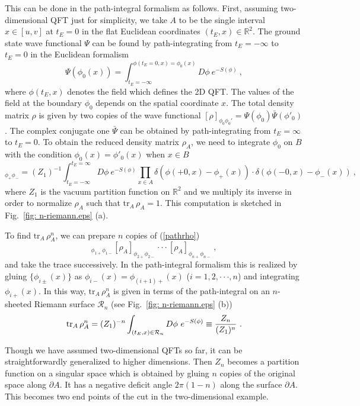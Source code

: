 \documentclass[12pt]{article}
\def\frac#1#2{{#1\over #2}}
\def\de{\partial}
\def\f {\frac}
\def\ddd{\cdot\cdot\cdot}
\def\frac#1#2{{#1\over #2}}
\def\be{\begin{equation}}
\def\ee{\end{equation}}
\begin{document}
This can be done in the path-integral formalism as follows.
First, assuming two-dimensional QFT just for simplicity,
we take
$A$ to be the single interval $x\in [u,v]$ at $t_E=0$ in
the flat Euclidean coordinates $(t_E,x)\in \mathbb{R}^{2}$. The
ground state wave functional $\Psi$ can be found by path-integrating
from $t_{E}=-\infty$ to $t_{E}=0$ in the Euclidean formalism \be
\Psi\left(\phi_0(x)\right)=
\int^{\phi(t_{E}=0,x)=\phi_0(x)}_{t_{E}=-\infty} D\phi~
e^{-S(\phi)} \ ,\ee where $\phi(t_E,x)$ denotes the field which defines
the 2D QFT.
The values of the field at the boundary $\phi_0$ depends
on the spatial coordinate $x$. The total density matrix $\rho$ is
given by two copies of the wave functional
$[\rho]_{\phi_0\phi_0'}=\Psi(\phi_0)\bar{\Psi}(\phi'_0)$. The
complex conjugate one $\bar{\Psi}$ can be obtained by
path-integrating from $t_{E}=\infty$ to $t_{E}=0$. To obtain the
reduced density matrix $\rho_A$, we need to integrate $\phi_0$ on
$B$ with the condition $\phi_{0}(x)=\phi'_0(x)$ when $x\in B$
\be
[\rho_A]_{\phi_+ \phi_-}=(Z_{1})^{-1}\int
^{t_E=\infty}_{t_{E}=-\infty} D\phi~ e^{-S(\phi)}\prod_{x\in
A}\delta\left(\phi(+0,x)-\phi_+(x)\right)\cdot
\delta\left(\phi(-0,x)-\phi_-(x)\right) \ , \label{pathrho}\ee where
$Z_1$ is the vacuum partition function on $\mathbb{R}^{2}$ and we
multiply its inverse in order to normalize $\rho_A$ such that
$\mathrm{tr}_A\,\rho_A=1$. This computation is sketched in Fig.\
\ref{fig: n-riemann.eps} (a).


To find $\mathrm{tr}_A\,\rho_A^n$, we can prepare $n$ copies of
(\ref{pathrho}) \be [\rho_A]_{\phi_{1+}
\phi_{1-}}[\rho_A]_{\phi_{2+} \phi_{2-}}\ddd [\rho_A]_{\phi_{n+}
\phi_{n-}} \ ,\ee and take the trace successively. In the path-integral
formalism this is realized by gluing $\{\phi_{i\pm}(x)\}$ as
$\phi_{i-}(x)=\phi_{(i+1)+}(x)$ ($i=1,2,\ddd,n$) and integrating
$\phi_{i+}(x)$. In this way, $\mathrm{tr}_A\,\rho_A^n$ is given in
terms of the path-integral on an $n$-sheeted Riemann surface
${\mathcal R}_n$ (see Fig.\ \ref{fig: n-riemann.eps} (b)) \be
\mathrm{tr}_A\,\rho_A^n=(Z_1)^{-n}\int_{(t_E,x)\in {\mathcal R}_n}
D\phi~ e^{-S(\phi)}\equiv \f{Z_n}{(Z_1)^n} \ . \label{nsheetp}  \ee

Though we have assumed two-dimensional
QFTs so far, it can be straightforwardly generalized to
higher dimensions. Then $Z_n$ becomes a partition function on a singular space which is
obtained by gluing $n$ copies of the original space along $\de A$. It has a negative deficit
angle $2\pi (1-n)$ along the surface $\de A$. This becomes two end points of the cut in the
two-dimensional example.
\end{document}
